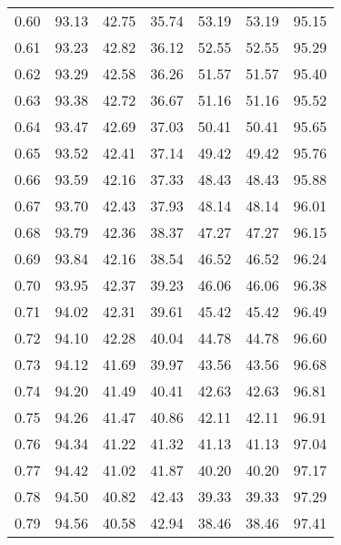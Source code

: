 \begin{tabular}{|c|c|c|c|c|c|c|}
      0.60 &     93.13 &     42.75 &      35.74 &   53.19 &      53.19 &         95.15 \\
      0.61 &     93.23 &     42.82 &      36.12 &   52.55 &      52.55 &         95.29 \\
      0.62 &     93.29 &     42.58 &      36.26 &   51.57 &      51.57 &         95.40 \\
      0.63 &     93.38 &     42.72 &      36.67 &   51.16 &      51.16 &         95.52 \\
      0.64 &     93.47 &     42.69 &      37.03 &   50.41 &      50.41 &         95.65 \\
      0.65 &     93.52 &     42.41 &      37.14 &   49.42 &      49.42 &         95.76 \\
      0.66 &     93.59 &     42.16 &      37.33 &   48.43 &      48.43 &         95.88 \\
      0.67 &     93.70 &     42.43 &      37.93 &   48.14 &      48.14 &         96.01 \\
      0.68 &     93.79 &     42.36 &      38.37 &   47.27 &      47.27 &         96.15 \\
      0.69 &     93.84 &     42.16 &      38.54 &   46.52 &      46.52 &         96.24 \\
      0.70 &     93.95 &     42.37 &      39.23 &   46.06 &      46.06 &         96.38 \\
      0.71 &     94.02 &     42.31 &      39.61 &   45.42 &      45.42 &         96.49 \\
      0.72 &     94.10 &     42.28 &      40.04 &   44.78 &      44.78 &         96.60 \\
      0.73 &     94.12 &     41.69 &      39.97 &   43.56 &      43.56 &         96.68 \\
      0.74 &     94.20 &     41.49 &      40.41 &   42.63 &      42.63 &         96.81 \\
      0.75 &     94.26 &     41.47 &      40.86 &   42.11 &      42.11 &         96.91 \\
      0.76 &     94.34 &     41.22 &      41.32 &   41.13 &      41.13 &         97.04 \\
      0.77 &     94.42 &     41.02 &      41.87 &   40.20 &      40.20 &         97.17 \\
      0.78 &     94.50 &     40.82 &      42.43 &   39.33 &      39.33 &         97.29 \\
      0.79 &     94.56 &     40.58 &      42.94 &   38.46 &      38.46 &         97.41 \\

\end{tabular}
